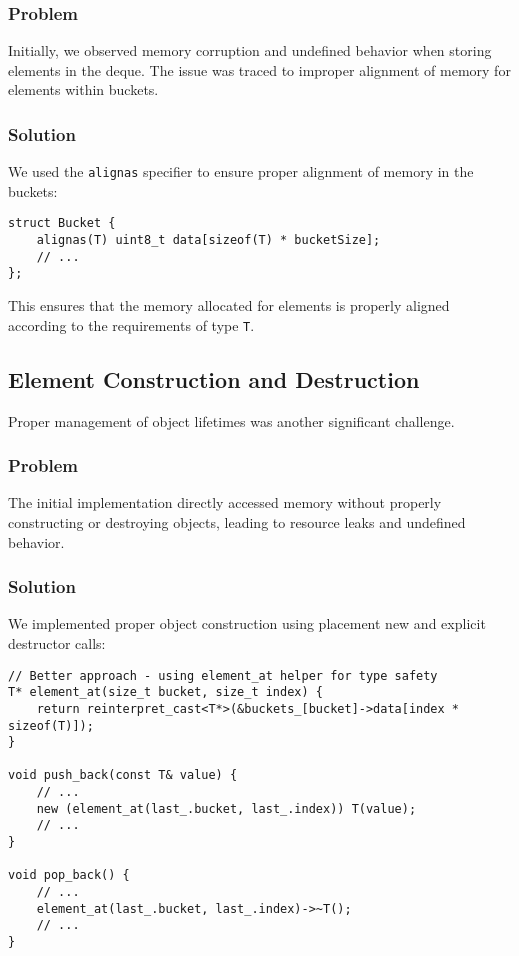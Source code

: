 \documentclass[a4paper,12pt]{article}
\begin{document}
\subsubsection{Problem}
Initially, we observed memory corruption and undefined behavior when storing elements in the deque. The issue was traced to improper alignment of memory for elements within buckets.

\subsubsection{Solution}
We used the \texttt{alignas} specifier to ensure proper alignment of memory in the buckets:

\begin{lstlisting}
struct Bucket {
    alignas(T) uint8_t data[sizeof(T) * bucketSize];
    // ...
};
\end{lstlisting}

This ensures that the memory allocated for elements is properly aligned according to the requirements of type \texttt{T}.

\subsection{Element Construction and Destruction}
Proper management of object lifetimes was another significant challenge.

\subsubsection{Problem}
The initial implementation directly accessed memory without properly constructing or destroying objects, leading to resource leaks and undefined behavior.

\subsubsection{Solution}
We implemented proper object construction using placement new and explicit destructor calls:

\begin{lstlisting}
// Better approach - using element_at helper for type safety
T* element_at(size_t bucket, size_t index) {
    return reinterpret_cast<T*>(&buckets_[bucket]->data[index * sizeof(T)]);
}

void push_back(const T& value) {
    // ...
    new (element_at(last_.bucket, last_.index)) T(value);
    // ...
}

void pop_back() {
    // ...
    element_at(last_.bucket, last_.index)->~T();
    // ...
}
\end{lstlisting}
\end{document}
